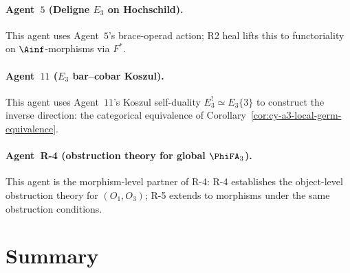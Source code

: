 \paragraph{Agent~$5$ (Deligne $E_3$ on Hochschild).}  This agent uses
Agent~$5$'s brace-operad action; R2 heal lifts this to functoriality on
$\Ainf$-morphisms via $F^*$.

\paragraph{Agent~$11$ ($E_3$ bar--cobar Koszul).}  This agent uses
Agent~$11$'s Koszul self-duality $E_3^! \simeq E_3\{3\}$ to construct
the inverse direction: the categorical equivalence of
Corollary~\ref{cor:cy-a3-local-germ-equivalence}.

\paragraph{Agent~R-4 (obstruction theory for global $\PhiFA_3$).}
This agent is the morphism-level partner of R-4: R-4 establishes the
object-level obstruction theory for $(O_1, O_3)$; R-5 extends to
morphisms under the same obstruction conditions.


\section*{Summary}

